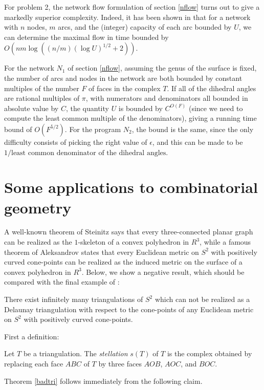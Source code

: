 \documentclass{acmart}
\newcommand{\thm}[2]{\begin{#1} #2 \end{#1}}
\begin{document}
For problem 2, the network flow formulation of section \ref{nflow}
turns out to give a markedly superior complexity. Indeed, it has been
shown in \cite{aot} that for a network with $n$ nodes,
$m$ arcs, and the (integer) capacity of each arc bounded by $U$, we
can determine the maximal flow in time bounded by $O(n m
\log((n/m)(\log U)^{1/2}+2))$. 

For the network $N_1$ of section
\ref{nflow}, assuming the genus of the surface is fixed, the number of
arcs and nodes in the network are both bounded by constant multiples
of the number $F$ of faces in the complex $T$. If all of the dihedral
angles are rational multiples of $\pi$, with numerators and
denominators all bounded in absolute value by $C$, the quantity $U$ is
bounded by $C^{O(F)}$ (since we need to compute the least common
multiple of the denominators), giving a running time bound of
$O(F^{5/2}).$ For the program $N_2$, the bound is the same, since the
only difficulty consists of picking the right value of $\epsilon$, and
this can be made to be $1/\mbox{least common denominator of the
dihedral angles}$.

\section{Some applications to combinatorial geometry}
\label{someapps}

A well-known theorem of Steinitz says that every three-connected 
planar graph can be realized as the $1$-skeleton of a convex 
polyhedron in $R^{3}$, while a famous theorem of Aleksandrov states 
that every Euclidean metric on $S^{2}$ with positively curved 
cone-points can be realized as the induced metric on the surface of a 
convex polyhedron in $R^{3}$. Below, we show a negative result, which 
should be compared with the final example of \cite{rit}:

\thm{theorem}
{
\label{badtri}
There exist infinitely many triangulations of $S^{2}$ which can not be
realized as a  Delaunay triangulation with respect to the cone-points
of any Euclidean  metric on $S^{2}$ with positively curved cone-points.
}

First a definition:

\thm{definition}
{
Let $T$ be a triangulation. The \emph{stellation} $s(T)$ of $T$ is the 
complex obtained by replacing each face $ABC$ of $T$ by three faces 
$AOB$, $AOC$, and $BOC$.
}

Theorem \ref{badtri} follows immediately from the following claim.
\end{document}
